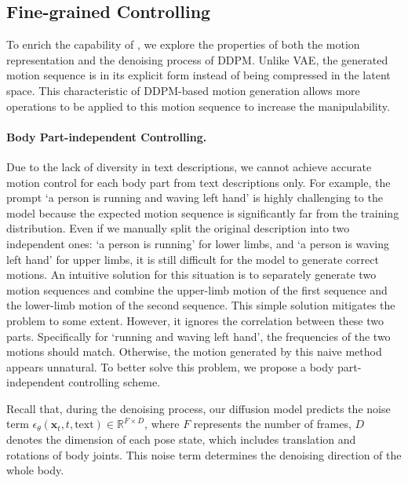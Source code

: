 \subsection{Fine-grained Controlling}\label{sec3_5}

To enrich the capability of \name, we explore the properties of both the motion representation and the denoising process of DDPM. Unlike VAE, the generated motion sequence is in its explicit form instead of being compressed in the latent space. This characteristic of DDPM-based motion generation allows more operations to be applied to this motion sequence to increase the manipulability.

\paragraph{Body Part-independent Controlling.}
Due to the lack of diversity in text descriptions, we cannot achieve accurate motion control for each body part from text descriptions only. For example, the prompt `a person is running and waving left hand' is highly challenging to the model because the expected motion sequence is significantly far from the training distribution. Even if we manually split the original description into two independent ones: `a person is running' for lower limbs, and `a person is waving left hand' for upper limbs, it is still difficult for the model to generate correct motions. An intuitive solution for this situation is to separately generate two motion sequences and combine the upper-limb motion of the first sequence and the lower-limb motion of the second sequence. This simple solution mitigates the problem to some extent. However, it ignores the correlation between these two parts. Specifically for `running and waving left hand', the frequencies of the two motions should match. Otherwise, the motion generated by this naive method appears unnatural. To better solve this problem, we propose a body part-independent controlling scheme.

Recall that, during the denoising process, our diffusion model predicts the noise term $\epsilon_{\theta}(\mathbf{x}_t,t,\textrm{text}) \in \mathbb{R}^{F \times D}$, where $F$ represents the number of frames, $D$ denotes the dimension of each pose state, which includes translation and rotations of body joints. This noise term determines the denoising direction of the whole body. 

